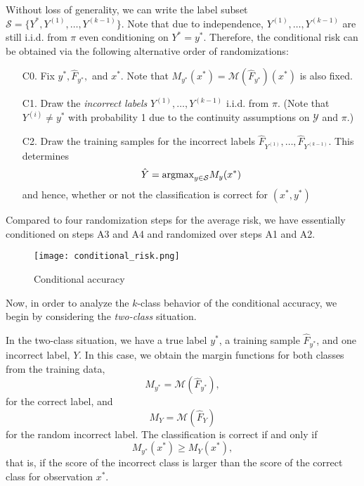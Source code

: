 \documentclass[12pt]{article}
\begin{document}
Without loss of generality, we can write the label subset $\mathcal{S}
= \{Y^*, Y^{(1)},\hdots, Y^{(k-1)}\}$.  Note that due to independence,
$Y^{(1)},\hdots, Y^{(k-1)}$ are still i.i.d. from $\pi$ even
conditioning on $Y^* = y^*.$ Therefore, the conditional risk can be
obtained via the following alternative order of randomizations:
\begin{enumerate}
\item[C0.] 
Fix $y^*, \hat{F}_{y^*},$ and $x^*$.  Note that $M_{y^*}(x^*)
= \mathcal{M}(\hat{F}_{y^*})(x^*)$ is also fixed.
\item[C1.]
Draw the \emph{incorrect labels} $Y^{(1)},\hdots, Y^{(k-1)}$ i.i.d. from
$\pi$.  (Note that $Y^{(i)} \neq y^*$ with probability 1 due to the
continuity assumptions on $\mathcal{Y}$ and $\pi$.)
\item[C2.]
Draw the training samples for the incorrect labels
$\hat{F}_{Y^{(1)}},\hdots, \hat{F}_{Y^{(k-1)}}$.  This determines
\[
\hat{Y} = \text{argmax}_{y \in \mathcal{S}} M_y(x^*)
\]
and hence, whether or not the classification is correct for $(x^*, y^*)$
\end{enumerate}
Compared to four randomization steps for the average risk, we have
essentially conditioned on steps A3 and A4 and randomized over steps
A1 and A2.

\begin{figure}[h]
\centering
\texttt{[image: conditional\_risk.png]}
\caption{Conditional accuracy}\label{fig:conditional_risk}
\end{figure}

Now, in order to analyze the $k$-class behavior of the conditional
accuracy, we begin by considering the \emph{two-class} situation.

In the two-class situation, we have a true label $y^*$, a training
sample $\hat{F}_{y^*}$, and one incorrect label, $Y$.  
In this case, we obtain the margin functions for both classes from the training data,
\[
M_{y^*} = \mathcal{M}(\hat{F}_{y^*}),
\]
for the correct label,
and
\[
M_Y = \mathcal{M}(\hat{F}_Y)
\]
for the random incorrect label.  The classification is correct if and
only if \[M_{y^*}(x^*) \geq M_Y(x^*),\] that is, if the score of the
incorrect class is larger than the score of the correct class for
observation $x^*$.
\end{document}
